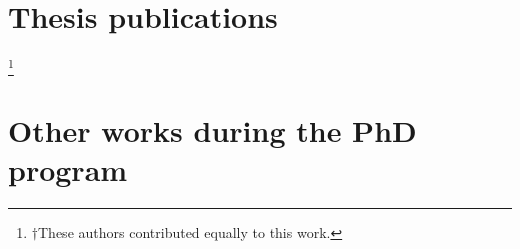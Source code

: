 \chapter*{Thesis publications}
\begin{refsection}[ownpubs]
  \small%
  \nocite{*}
  \newrefcontext[sorting=ydnt]
  \printbibliography[heading=none]
\end{refsection}

\let\svthefootnote\thefootnote
\let\thefootnote\relax\footnote{$\dagger$These authors contributed equally to this work.}
\addtocounter{footnote}{-1}\let\thefootnote\svthefootnote

\begingroup
\let\clearpage\relax
{}
\chapter*{Other works during the PhD program}
\begin{refsection}[sidepubs]
  \small%
  \nocite{*}
  \newrefcontext[sorting=ydnt]
  \printbibliography[heading=none]
\end{refsection}
\endgroup

%

